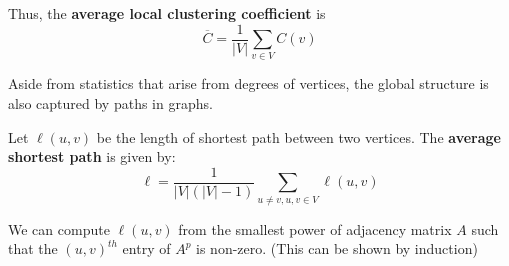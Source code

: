 \documentclass{article}
\begin{document}
Thus, the \textbf{average local clustering coefficient} is 
\[
    \overline{C}=\frac{1}{|V|}\sum_{v \in V} C(v)
\]

Aside from statistics that arise from degrees of vertices, the global structure is also captured by paths in graphs. 

\begin{definition}
    Let $\ell(u,v)$ be the length of shortest path between two vertices. The \textbf{average shortest path} is given by:
    $$
    \ell = \frac{1}{|V|(|V|-1)} \sum_{u\neq v, u,v\in V} \ell (u,v)
    $$
\end{definition}

\begin{remark}
    We can compute $\ell(u,v)$ from the smallest power of adjacency matrix $A$ such that the $(u,v)^{th}$ entry of $A^p$ is non-zero. (This can be shown by induction)
\end{remark}

\newpage


\end{document}

